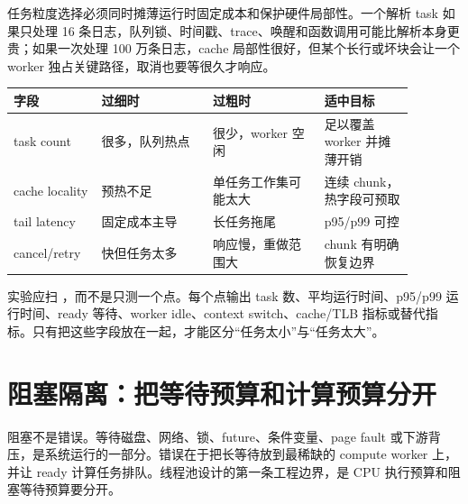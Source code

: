 任务粒度选择必须同时摊薄运行时固定成本和保护硬件局部性。一个解析 task 如果只处理 16 条日志，队列锁、时间戳、trace、唤醒和函数调用可能比解析本身更贵；如果一次处理 100 万条日志，cache 局部性很好，但某个长行或坏块会让一个 worker 独占关键路径，取消也要等很久才响应。

\begin{center}
\begin{tabular}{p{0.18\linewidth}p{0.25\linewidth}p{0.25\linewidth}p{0.2\linewidth}}
\toprule
字段 & 过细时 & 过粗时 & 适中目标 \\
\midrule
task count & 很多，队列热点 & 很少，worker 空闲 & 足以覆盖 worker 并摊薄开销 \\
cache locality & 预热不足 & 单任务工作集可能太大 & 连续 chunk，热字段可预取 \\
tail latency & 固定成本主导 & 长任务拖尾 & p95/p99 可控 \\
cancel/retry & 快但任务太多 & 响应慢，重做范围大 & chunk 有明确恢复边界 \\
\bottomrule
\end{tabular}
\end{center}

实验应扫 ，而不是只测一个点。每个点输出 task 数、平均运行时间、p95/p99 运行时间、ready 等待、worker idle、context switch、cache/TLB 指标或替代指标。只有把这些字段放在一起，才能区分“任务太小”与“任务太大”。

\section{阻塞隔离：把等待预算和计算预算分开}

阻塞不是错误。等待磁盘、网络、锁、future、条件变量、page fault 或下游背压，是系统运行的一部分。错误在于把长等待放到最稀缺的 compute worker 上，并让 ready 计算任务排队。线程池设计的第一条工程边界，是 CPU 执行预算和阻塞等待预算要分开。


